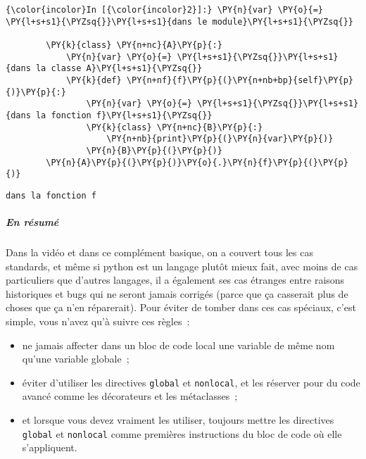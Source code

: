    \begin{Verbatim}[commandchars=\\\{\},frame=single,framerule=0.3mm,rulecolor=\color{cellframecolor}]
{\color{incolor}In [{\color{incolor}2}]:} \PY{n}{var} \PY{o}{=} \PY{l+s+s1}{\PYZsq{}}\PY{l+s+s1}{dans le module}\PY{l+s+s1}{\PYZsq{}}
        
        \PY{k}{class} \PY{n+nc}{A}\PY{p}{:}
            \PY{n}{var} \PY{o}{=} \PY{l+s+s1}{\PYZsq{}}\PY{l+s+s1}{dans la classe A}\PY{l+s+s1}{\PYZsq{}}
            \PY{k}{def} \PY{n+nf}{f}\PY{p}{(}\PY{n+nb+bp}{self}\PY{p}{)}\PY{p}{:}
                \PY{n}{var} \PY{o}{=} \PY{l+s+s1}{\PYZsq{}}\PY{l+s+s1}{dans la fonction f}\PY{l+s+s1}{\PYZsq{}}
                \PY{k}{class} \PY{n+nc}{B}\PY{p}{:}
                    \PY{n+nb}{print}\PY{p}{(}\PY{n}{var}\PY{p}{)}
                \PY{n}{B}\PY{p}{(}\PY{p}{)}
        \PY{n}{A}\PY{p}{(}\PY{p}{)}\PY{o}{.}\PY{n}{f}\PY{p}{(}\PY{p}{)}
\end{Verbatim}


    \begin{Verbatim}[commandchars=\\\{\},frame=single,framerule=0.3mm,rulecolor=\color{cellframecolor}]
dans la fonction f
\end{Verbatim}

    \hypertarget{en-ruxe9sumuxe9}{%
\subparagraph{En résumé}\label{en-ruxe9sumuxe9}}

    Dans la vidéo et dans ce complément basique, on a couvert tous les cas
standards, et même si python est un langage plutôt mieux fait, avec
moins de cas particuliers que d'autres langages, il a également ses cas
étranges entre raisons historiques et bugs qui ne seront jamais corrigés
(parce que ça casserait plus de choses que ça n'en réparerait). Pour
éviter de tomber dans ces cas spéciaux, c'est simple, vous n'avez qu'à
suivre ces règles~:

\begin{itemize}
\tightlist
\item
  ne jamais affecter dans un bloc de code local une variable de même nom
  qu'une variable globale~;
\item
  éviter d'utiliser les directives \texttt{global} et \texttt{nonlocal},
  et les réserver pour du code avancé comme les décorateurs et les
  métaclasses~;
\item
  et lorsque vous devez vraiment les utiliser, toujours mettre les
  directives \texttt{global} et \texttt{nonlocal} comme premières
  instructions du bloc de code où elle s'appliquent.
\end{itemize}

